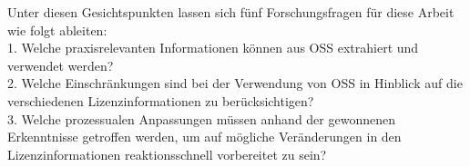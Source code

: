 Unter diesen Gesichtspunkten lassen sich fünf Forschungsfragen für diese Arbeit wie folgt ableiten:\\ 

1. Welche praxisrelevanten Informationen können aus OSS extrahiert und verwendet werden?\\ 



2. Welche Einschränkungen sind bei der Verwendung von OSS in Hinblick auf die verschiedenen Lizenzinformationen zu berücksichtigen?\\ 



3. Welche prozessualen Anpassungen müssen anhand der gewonnenen Erkenntnisse getroffen werden, um auf mögliche Veränderungen in den Lizenzinformationen reaktionsschnell vorbereitet zu sein?\\ 






